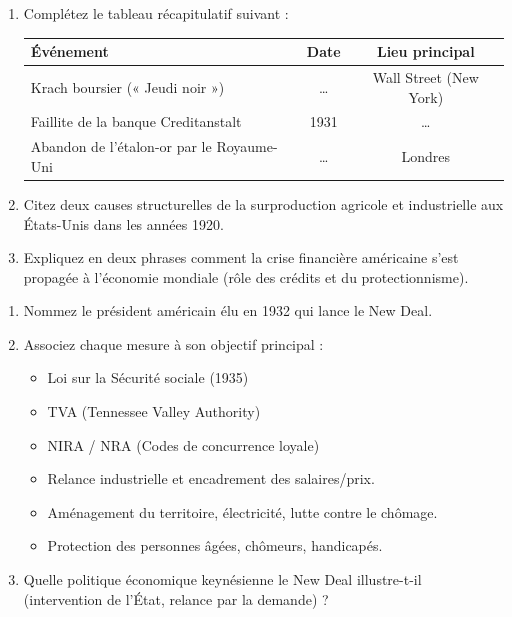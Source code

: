 \documentclass[11pt]{article}
\begin{document}
\begin{exercice}
\begin{enumerate}
    \item Complétez le tableau récapitulatif suivant :
    \begin{center}
    \begin{tabular}{|l|c|c|}
    \hline
    \textbf{Événement} & \textbf{Date} & \textbf{Lieu principal} \\
    \hline
    Krach boursier (« Jeudi noir ») & \ldots & Wall Street (New York) \\
    \hline
    Faillite de la banque Creditanstalt & 1931 & \ldots \\
    \hline
    Abandon de l'étalon-or par le Royaume-Uni & \ldots & Londres \\
    \hline
    \end{tabular}
    \end{center}
    \item Citez deux causes structurelles de la surproduction agricole et industrielle aux États-Unis dans les années 1920.
    \item Expliquez en deux phrases comment la crise financière américaine s'est propagée à l'économie mondiale (rôle des crédits et du protectionnisme).
\end{enumerate}
\end{exercice}

\begin{exercice}
\begin{enumerate}
    \item Nommez le président américain élu en 1932 qui lance le New Deal.
    \item Associez chaque mesure à son objectif principal :
    \begin{itemize}
        \item[1.] Loi sur la Sécurité sociale (1935)
        \item[2.] TVA (Tennessee Valley Authority)
        \item[3.] NIRA / NRA (Codes de concurrence loyale)
    \end{itemize}
    \begin{itemize}
        \item[A.] Relance industrielle et encadrement des salaires/prix.
        \item[B.] Aménagement du territoire, électricité, lutte contre le chômage.
        \item[C.] Protection des personnes âgées, chômeurs, handicapés.
    \end{itemize}
    \item Quelle politique économique keynésienne le New Deal illustre-t-il (intervention de l'État, relance par la demande) ?
\end{enumerate}
\end{exercice}
\end{document}

